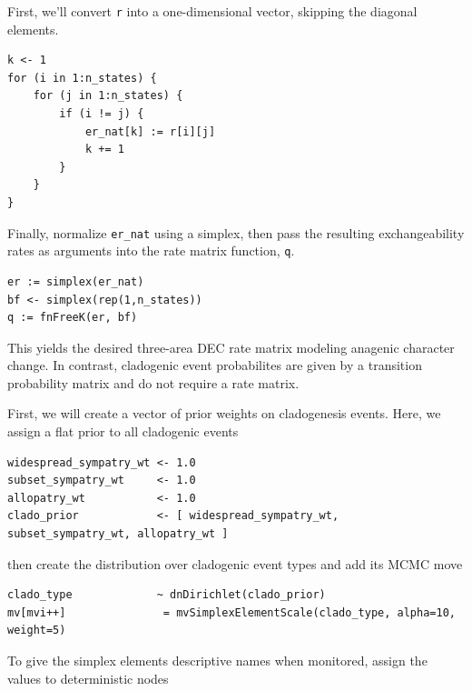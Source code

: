 First, we'll convert {\tt r} into a one-dimensional vector, skipping the diagonal elements.

\begin{snugshade}
\begin{lstlisting}
k <- 1
for (i in 1:n_states) {
    for (j in 1:n_states) {
        if (i != j) {
            er_nat[k] := r[i][j]
            k += 1
        }
    }
}
\end{lstlisting}
\end{snugshade}

Finally, normalize {\tt er\_nat} using a simplex, then pass the resulting exchangeability rates as arguments into the rate matrix function, {\tt q}.

\begin{snugshade}
\begin{lstlisting}
er := simplex(er_nat)
bf <- simplex(rep(1,n_states))
q := fnFreeK(er, bf)
\end{lstlisting}
\end{snugshade}

This yields the desired three-area DEC rate matrix modeling anagenic character change. In contrast, cladogenic event probabilites are given by a transition probability matrix and do not require a rate matrix.

First, we will create a vector of prior weights on cladogenesis events. Here, we assign a flat prior to all cladogenic events

\begin{snugshade}
\begin{lstlisting}
widespread_sympatry_wt <- 1.0
subset_sympatry_wt     <- 1.0
allopatry_wt           <- 1.0
clado_prior            <- [ widespread_sympatry_wt, subset_sympatry_wt, allopatry_wt ]
\end{lstlisting}
\end{snugshade}

then create the distribution over cladogenic event types and add its MCMC move

\begin{snugshade}
\begin{lstlisting}
clado_type             ~ dnDirichlet(clado_prior)
mv[mvi++]               = mvSimplexElementScale(clado_type, alpha=10, weight=5)
\end{lstlisting}
\end{snugshade}

To give the simplex elements descriptive names when monitored, assign the values to deterministic nodes

